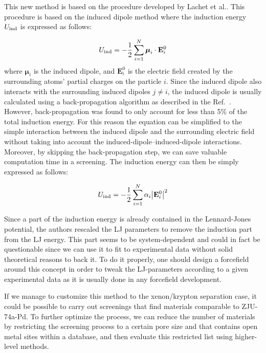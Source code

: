 \documentclass[main]{subfiles}
\begin{document}
This new method is based on the procedure developed by Lachet et al.\autocite{Lachet_1998}. This procedure is based on the induced dipole method where the induction energy $U_{\text{ind}}$ is expressed as follows:

\begin{equation}
  U_{\text{ind}} = -\frac{1}{2} \sum_{i=1}^{N} \boldsymbol{\mu}_i \cdot \mathbf{E}_i^0
\end{equation}
where $\boldsymbol{\mu}_i$ is the induced dipole, and $\mathbf{E}_i^0$ is the electric field created by the surrounding atoms' partial charges on the particle $i$. Since the induced dipole also interacts with the surrounding induced dipoles $j\neq i$, the induced dipole is usually calculated using a back-propagation algorithm as described in the Ref.~\cite{Lachet_1998}. However, back-propagation was found to only account for less than {5\%} of the total induction energy. For this reason the equation can be simplified to the simple interaction between the induced dipole and the surrounding electric field without taking into account the induced-dipole--induced-dipole interactions. Moreover, by skipping the back-propagation step, we can save valuable computation time in a screening. The induction energy can then be simply expressed as follows:

\begin{equation}
  U_{\text{ind}} = -\frac{1}{2} \sum_{i=1}^{N} \alpha_i {\left\lvert\mathbf{E}_i^0\right\rvert}^2
\end{equation}

Since a part of the induction energy is already contained in the Lennard-Jones potential, the authors rescaled the LJ parameters to remove the induction part from the LJ energy. This part seems to be system-dependent and could in fact be questionable since we can use it to fit to experimental data without solid theoretical reasons to back it. To do it properly, one should design a forcefield around this concept in order to tweak the LJ-parameters according to a given experimental data as it is usually done in any forcefield development. 

If we manage to customize this method to the xenon/krypton separation case, it could be possible to carry out screenings that find materials comparable to ZJU-74a-Pd. To further optimize the process, we can reduce the number of materials by restricting the screening process to a certain pore size and that contains open metal sites within a database, and then evaluate this restricted list using higher-level methods. 


\OnlyInSubfile{\printglobalbibliography}
\end{document}
